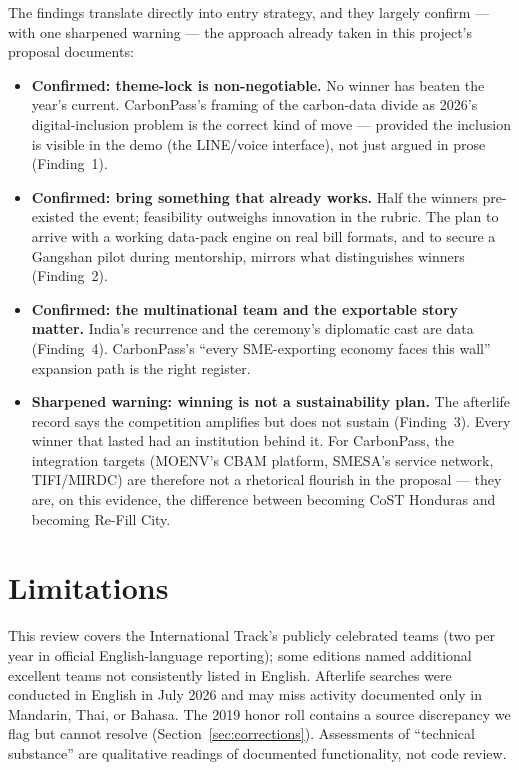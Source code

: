 The findings translate directly into entry strategy, and they largely confirm
--- with one sharpened warning --- the approach already taken in this
project's proposal documents:

\begin{itemize}[leftmargin=1.3em]
\item \textbf{Confirmed: theme-lock is non-negotiable.} No winner has beaten
the year's current. CarbonPass's framing of the carbon-data divide as 2026's
digital-inclusion problem is the correct kind of move --- provided the
inclusion is visible in the demo (the LINE/voice interface), not just argued
in prose (Finding~1).
\item \textbf{Confirmed: bring something that already works.} Half the
winners pre-existed the event; feasibility outweighs innovation in the rubric.
The plan to arrive with a working data-pack engine on real bill formats, and
to secure a Gangshan pilot during mentorship, mirrors what distinguishes
winners (Finding~2).
\item \textbf{Confirmed: the multinational team and the exportable story
matter.} India's recurrence and the ceremony's diplomatic cast are data
(Finding~4). CarbonPass's ``every SME-exporting economy faces this wall''
expansion path is the right register.
\item \textbf{Sharpened warning: winning is not a sustainability plan.} The
afterlife record says the competition amplifies but does not sustain
(Finding~3). Every winner that lasted had an institution behind it. For
CarbonPass, the integration targets (MOENV's CBAM platform, SMESA's service
network, TIFI/MIRDC) are therefore not a rhetorical flourish in the proposal
--- they are, on this evidence, the difference between becoming CoST Honduras
and becoming Re-Fill City.
\end{itemize}

\section{Limitations}\label{sec:limits}

This review covers the International Track's publicly celebrated teams (two
per year in official English-language reporting); some editions named
additional excellent teams not consistently listed in English. Afterlife
searches were conducted in English in July 2026 and may miss activity
documented only in Mandarin, Thai, or Bahasa. The 2019 honor roll contains a
source discrepancy we flag but cannot resolve (Section~\ref{sec:corrections}).
Assessments of ``technical substance'' are qualitative readings of documented
functionality, not code review.
